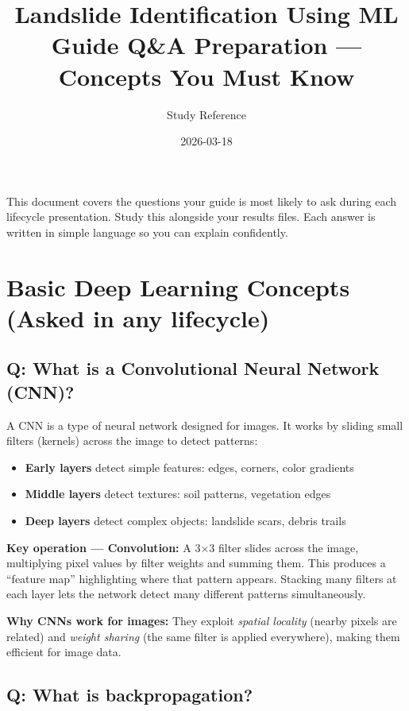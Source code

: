 \documentclass[11pt]{article}
\title{Landslide Identification Using ML \\ \large Guide Q\&A Preparation --- Concepts You Must Know}
\author{Study Reference}
\date{2026-03-18}
\begin{document}
\maketitle

\noindent This document covers the questions your guide is most likely to ask during each lifecycle presentation. Study this alongside your results files. Each answer is written in simple language so you can explain confidently.

\tableofcontents
\newpage

\section{Basic Deep Learning Concepts (Asked in any lifecycle)}

\subsection{Q: What is a Convolutional Neural Network (CNN)?}

A CNN is a type of neural network designed for images. It works by sliding small filters (kernels) across the image to detect patterns:

\begin{itemize}[noitemsep]
    \item \textbf{Early layers} detect simple features: edges, corners, color gradients
    \item \textbf{Middle layers} detect textures: soil patterns, vegetation edges
    \item \textbf{Deep layers} detect complex objects: landslide scars, debris trails
\end{itemize}

\textbf{Key operation --- Convolution:} A 3$\times$3 filter slides across the image, multiplying pixel values by filter weights and summing them. This produces a ``feature map'' highlighting where that pattern appears. Stacking many filters at each layer lets the network detect many different patterns simultaneously.

\textbf{Why CNNs work for images:} They exploit \textit{spatial locality} (nearby pixels are related) and \textit{weight sharing} (the same filter is applied everywhere), making them efficient for image data.

\subsection{Q: What is backpropagation?}
\end{document}
